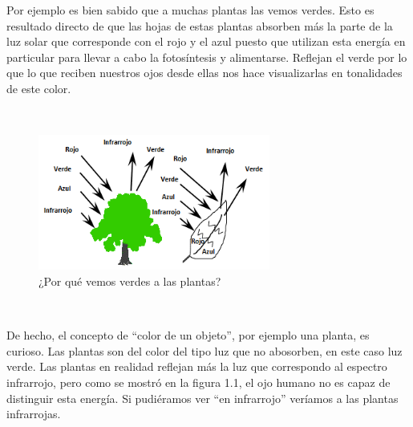 Por ejemplo es bien sabido que a muchas plantas las vemos verdes. Esto es resultado directo de que las hojas de estas plantas absorben más la parte de la luz solar que corresponde con el rojo y el azul puesto que utilizan esta energía en particular para llevar a cabo la fotosíntesis y alimentarse. Reflejan el verde por lo que lo que reciben nuestros ojos desde ellas nos hace visualizarlas en tonalidades de este color.


\\
\begin{figure}[h!]
\begin{center}
\leavevmode
\includegraphics[width=3in]{4_plantas.png}
\end{center}
\caption{¿Por qué vemos verdes a las plantas?}
\end{figure}
\\

\newpage

De hecho, el concepto de "`color de un objeto"', por ejemplo una planta, es curioso.  Las plantas son del color del tipo luz que no abosorben, en este caso luz verde. Las plantas en realidad reflejan más la luz que correspondo al espectro infrarrojo, pero como se mostró en la figura 1.1, el ojo humano no es capaz de distinguir esta energía. Si pudiéramos ver "`en infrarrojo"' veríamos a las plantas infrarrojas. 




